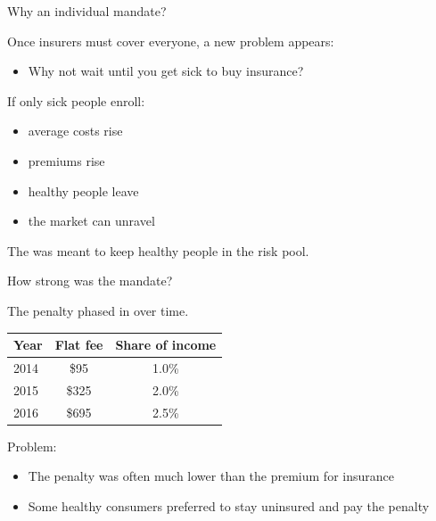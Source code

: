\begin{frame}{Why an individual mandate?}

    Once insurers must cover everyone, a new problem appears:
    \begin{itemize}
        \item Why not wait until you get sick to buy insurance?
    \end{itemize}

    \vspace{3mm}

    If only sick people enroll:
    \begin{itemize}
        \item average costs rise
        \item premiums rise
        \item healthy people leave
        \item the market can unravel
    \end{itemize}

    The  was meant to keep healthy people in the risk pool.

\end{frame}
\begin{frame}{How strong was the mandate?}

    The penalty phased in over time.

    \begin{center}
    \begin{tabular}{lcc}
        \toprule
        Year & Flat fee & Share of income \\
        \midrule
        2014 & \$95 & 1.0\% \\
        2015 & \$325 & 2.0\% \\
        2016 & \$695 & 2.5\% \\
        \bottomrule
    \end{tabular}
    \end{center}

    \vspace{2mm}

    Problem:
    \begin{itemize}
        \item The penalty was often much lower than the premium for insurance
        \item Some healthy consumers preferred to stay uninsured and pay the penalty
    \end{itemize}

\end{frame}
